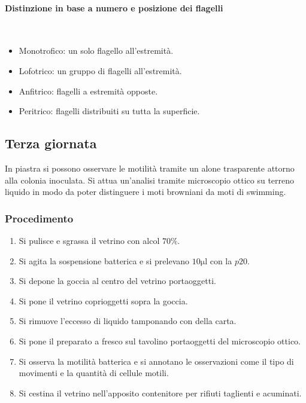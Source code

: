 			\paragraph{Distinzione in base a numero e posizione dei flagelli}\mbox{}\\
			\begin{multicols}{2}
				\begin{itemize}
					\item Monotrofico: un solo flagello all'estremit\`a.
					\item Lofotrico: un gruppo di flagelli all'estremit\`a.
					\item Anfitrico: flagelli a estremit\`a opposte.
					\item Peritrico: flagelli distribuiti su tutta la superficie.
				\end{itemize}
			\end{multicols}

	\subsection{Terza giornata}
	In piastra si possono osservare le motilit\`a tramite un alone trasparente attorno alla colonia inoculata.
	Si attua un'analisi tramite microscopio ottico su terreno liquido in modo da poter distinguere i moti browniani da moti di swimming.

		\subsubsection{Procedimento}
		\begin{enumerate}
			\item Si pulisce e sgrassa il vetrino con alcol $70\%$.
			\item Si agita la sospensione batterica e si prelevano $10\si{\micro\litre}$ con la $p20$.
			\item Si depone la goccia al centro del vetrino portaoggetti.
			\item Si pone il vetrino coprioggetti sopra la goccia.
			\item Si rimuove l'eccesso di liquido tamponando con della carta.
			\item Si pone il preparato a fresco sul tavolino portaoggetti del microscopio ottico.
			\item Si osserva la motilit\`a batterica e si annotano le osservazioni come il tipo di movimenti e la quantit\`a di cellule motili.
			\item Si cestina il vetrino nell'apposito contenitore per rifiuti taglienti e acuminati.
		\end{enumerate}
